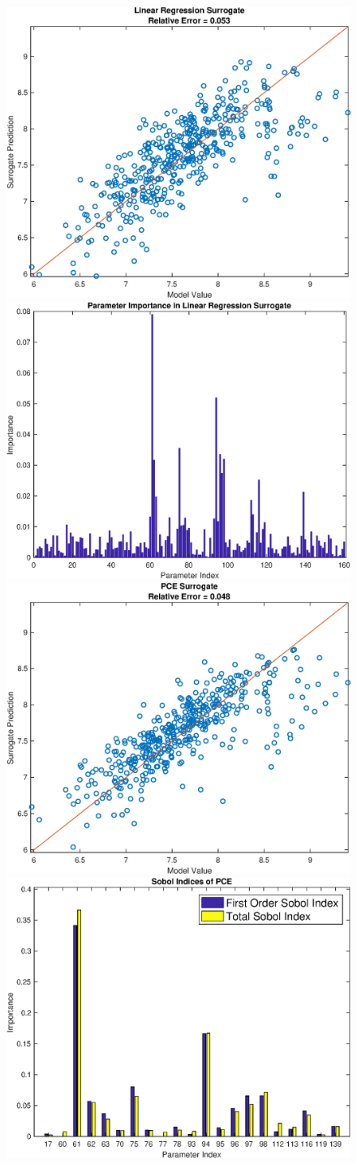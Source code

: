 \documentclass[12pt]{article}
\numberwithin{equation}{section}
\begin{document}
\begin{figure}[h]
\centering
\includegraphics[width=.49 \textwidth]{Figures/K_ECS_Max_QoI_LR_Prediction_Experimental.eps}
\includegraphics[width=.49 \textwidth]{Figures/K_ECS_Max_QoI_LR_VI_Experimental.eps}\\
\includegraphics[width=.49 \textwidth]{Figures/K_ECS_Max_QoI_PCE_Prediction_Experimental.eps}
\includegraphics[width=.49 \textwidth]{Figures/K_ECS_Max_QoI_PCE_SI_Experimental.eps}
\end{figure}
\end{document}
